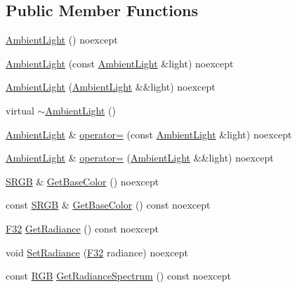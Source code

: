 \subsection*{Public Member Functions}
\begin{DoxyCompactItemize}
\item 
\hyperlink{classmage_1_1_ambient_light_a9f1aa7ecfbb56ecc10f8d149272e0f51}{Ambient\+Light} () noexcept
\item 
\hyperlink{classmage_1_1_ambient_light_acd05bee97c195c1a18242879008bf4ae}{Ambient\+Light} (const \hyperlink{classmage_1_1_ambient_light}{Ambient\+Light} \&light) noexcept
\item 
\hyperlink{classmage_1_1_ambient_light_a2807ca8add5f34da2e63ef8fdb80f7e1}{Ambient\+Light} (\hyperlink{classmage_1_1_ambient_light}{Ambient\+Light} \&\&light) noexcept
\item 
virtual \hyperlink{classmage_1_1_ambient_light_a511bb794b11f112e750da09f4044e7db}{$\sim$\+Ambient\+Light} ()
\item 
\hyperlink{classmage_1_1_ambient_light}{Ambient\+Light} \& \hyperlink{classmage_1_1_ambient_light_aa6f399dfc958a0073d93f98f0e8f0069}{operator=} (const \hyperlink{classmage_1_1_ambient_light}{Ambient\+Light} \&light) noexcept
\item 
\hyperlink{classmage_1_1_ambient_light}{Ambient\+Light} \& \hyperlink{classmage_1_1_ambient_light_ab12de420bef6074ef3ed3c4986d18621}{operator=} (\hyperlink{classmage_1_1_ambient_light}{Ambient\+Light} \&\&light) noexcept
\item 
\hyperlink{structmage_1_1_s_r_g_b}{S\+R\+GB} \& \hyperlink{classmage_1_1_ambient_light_a552a1d80d3032e6b93b6bc6e596d2ec5}{Get\+Base\+Color} () noexcept
\item 
const \hyperlink{structmage_1_1_s_r_g_b}{S\+R\+GB} \& \hyperlink{classmage_1_1_ambient_light_a65ed6d502514a63d545075ba4eb23b91}{Get\+Base\+Color} () const noexcept
\item 
\hyperlink{namespacemage_aa97e833b45f06d60a0a9c4fc22ae02c0}{F32} \hyperlink{classmage_1_1_ambient_light_ab41f72d902f590ebc62ab58427e2bdab}{Get\+Radiance} () const noexcept
\item 
void \hyperlink{classmage_1_1_ambient_light_aac9a833f2261eaa1bf5eaab7608fc878}{Set\+Radiance} (\hyperlink{namespacemage_aa97e833b45f06d60a0a9c4fc22ae02c0}{F32} radiance) noexcept
\item 
const \hyperlink{structmage_1_1_r_g_b}{R\+GB} \hyperlink{classmage_1_1_ambient_light_a5d135eeeef619f13435341eebd3fe476}{Get\+Radiance\+Spectrum} () const noexcept
\end{DoxyCompactItemize}
